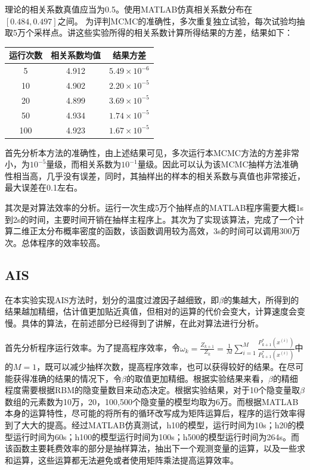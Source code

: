 \documentclass[journal,a4paper]{IEEEtran}
\begin{document}
		理论的相关系数真值应当为0.5。使用MATLAB仿真相关系数分布在$[0.484,0.497]$之间。
		为评判MCMC的准确性，多次重复独立试验，每次试验均抽取5万个采样点。讲这些实验所得的相关系数计算所得结果的方差，结果如下：
		\begin{center}
		\begin{tabular}{c|cc}
			\hline
			运行次数 & 相关系数均值 & 结果方差\\
			\hline
			5 & 4.912 & $5.49\times10^{-6}$ \\
			10 & 4.902 & $2.20\times10^{-5}$ \\
			20 & 4.899 & $3.69\times10^{-5}$ \\
			50 & 4.934 & $1.74\times10^{-5}$ \\
			100 & 4.923 & $1.67\times10^{-5}$ \\
			\hline
		\end{tabular}
		\end{center}
	
		首先分析本方法的准确性，由上述结果可见，多次运行本MCMC方法的方差非常小，为$10^{-5}$量级，而相关系数为$10^{-1}$量级。因此可以认为该MCMC抽样方法准确性相当高，几乎没有误差，同时，其抽样出的样本的相关系数与真值也非常接近，最大误差在0.1左右。
		
		其次是对算法效率的分析。运行一次生成5万个抽样点的MATLAB程序需要大概1s到2s的时间，主要时间开销在抽样主程序上。其次为了实现该算法，完成了一个计算二维正太分布概率密度的函数，该函数调用较为高效，3s的时间可以调用300万次。总体程序的效率较高。

	\subsection{AIS}
		在本实验实现AIS方法时，划分的温度过渡因子越细致，即$\beta$的集越大，所得到的结果越加精细，估计值更加贴近真值，但相对的运算的代价会变大，计算速度会变慢。具体的算法，在前述部分已经得到了讲解，在此对算法进行分析。
		
		首先分析程序运行效率。为了提高程序效率，令$ \omega_k = \frac{Z_{k+1}}{Z_k} =\frac{1}{M} \sum_{i = 1}^{M} \frac{P_{k+1}^*(x^{(i)})}{P_{k+1}^*(x^{(i)})}$中的$M=1$，既可以减少抽样次数，提高程序效率，也可以获得较好的结果。在尽可能获得准确的结果的情况下，令$\beta$的取值更加精细。根据实验结果来看，$\beta$的精细程度需要根据RBM的隐变量数目来动态决定。根据实验结果，对于10个隐变量取$\beta$数组的元素数为10万，20，100,500个隐变量的模型均取为6万。而根据MATLAB本身的运算特性，尽可能的将所有的循环改写成为矩阵运算后，程序的运行效率得到了大大的提高。经过MATLAB仿真测试，h10的模型，运行时间为10s；h20的模型运行时间为60s；h100的模型运行时间为100s；h500的模型运行时间为264s。而该函数主要耗费效率的部分是抽样算法，抽出下一个观测变量的运算，以及一些求和运算，这些运算都无法避免或者使用矩阵乘法提高运算效率。
		
\end{document}

